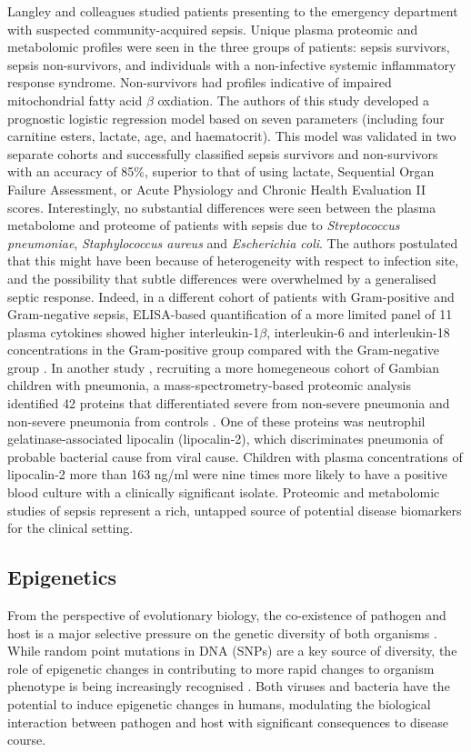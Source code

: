 Langley and colleagues \parencite{Langley2013} studied patients presenting to the emergency department with suspected community-acquired sepsis. Unique plasma proteomic and metabolomic profiles were seen in the three groups of patients: sepsis survivors, sepsis non-survivors, and individuals with a non-infective systemic inflammatory response syndrome. Non-survivors had profiles indicative of impaired mitochondrial fatty acid $\beta$ oxdiation. The authors of this study developed a prognostic logistic regression model based on seven parameters (including four carnitine esters, lactate, age, and haematocrit). This model was validated in two separate cohorts and successfully classified sepsis survivors and non-survivors with an accuracy of 85\%, superior to that of using lactate, Sequential Organ Failure Assessment, or Acute Physiology and Chronic Health Evaluation II scores. Interestingly, no substantial differences were seen between the plasma metabolome and proteome of patients with sepsis due to \textit{Streptococcus pneumoniae}, \textit{Staphylococcus aureus} and \textit{Escherichia coli}. The authors postulated that this might have been because of heterogeneity with respect to infection site, and the possibility that subtle differences were overwhelmed by a generalised septic response. Indeed, in a different cohort of patients with Gram-positive and Gram-negative sepsis, ELISA-based quantification of a more limited panel of 11 plasma cytokines showed higher interleukin-1$\beta$, interleukin-6 and interleukin-18 concentrations in the Gram-positive group compared with the Gram-negative group \parencite{Feezor2003}. In another study \parencite{Huang2014}, recruiting a more homegeneous cohort of Gambian children with pneumonia, a mass-spectrometry-based proteomic analysis identified 42 proteins that differentiated severe from non-severe pneumonia and non-severe pneumonia from controls \parencite{Huang2014}. One of these proteins was neutrophil gelatinase-associated lipocalin (lipocalin-2), which discriminates pneumonia of probable bacterial cause from viral cause. Children with plasma concentrations of lipocalin-2 more than 163 ng/ml were nine times more likely to have a positive blood culture with a clinically significant isolate. Proteomic and metabolomic studies of sepsis represent a rich, untapped source of potential disease biomarkers for the clinical setting. 

\subsection{Epigenetics}
From the perspective of evolutionary biology, the co-existence of pathogen and host is a major selective pressure on the genetic diversity of both organisms \parencite{Sironi2015}. While random point mutations in DNA (SNPs) are a key source of diversity, the role of epigenetic changes in contributing to more rapid changes to organism phenotype is being increasingly recognised \parencite{Rando2007}. Both viruses \parencite{Paschos2010} and bacteria \parencite{Hamon2008} have the potential to induce epigenetic changes in humans, modulating the biological interaction between pathogen and host with significant consequences to disease course.

